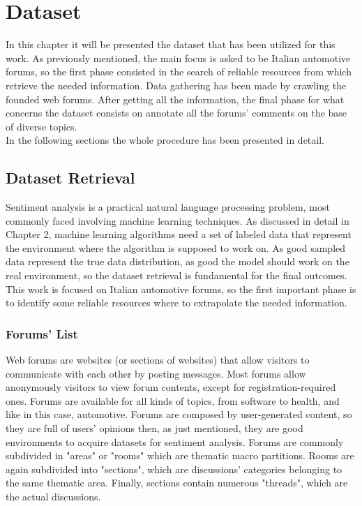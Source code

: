 
\chapter{Dataset}
\label{dataset}

In this chapter it will be presented the dataset that has been utilized for this work. As previously mentioned, the main focus is asked to be Italian automotive forums, so the first phase consisted in the search of reliable resources from which retrieve the needed information. Data gathering has been made by crawling the founded web forums. After getting all the information, the final phase for what concerns the dataset consists on annotate all the forums' comments on the base of diverse topics. \\
In the following sections the whole procedure has been presented in detail.

\section{Dataset Retrieval}

Sentiment analysis is a practical natural language processing problem, most commonly faced involving machine learning techniques. As discussed in detail in Chapter 2, machine learning algorithms need a set of labeled data that represent the environment where the algorithm is supposed to work on. As good sampled data represent the true data distribution, as good the model should work on the real environment, so the dataset retrieval is fundamental for the final outcomes.\\
This work is focused on Italian automotive forums, so the first important phase is to identify some reliable resources where to extrapolate the needed information. 


\subsection{Forums' List}

Web forums are websites (or sections of websites) that allow visitors to communicate with each other by posting messages. Most forums allow anonymously visitors to view forum contents, except for registration-required ones. Forums are available for all kinds of topics, from software to health, and like in this case, automotive. Forums are composed by user-generated content, so they are full of users' opinions then, as just mentioned, they are good environments to acquire datasets for sentiment analysis. Forums are commonly subdivided in "areas" or "rooms" which are thematic macro partitions. Rooms are again subdivided into "sections", which are discussions' categories belonging to the same thematic area. Finally, sections contain numerous "threads", which are the actual discussions.\\



